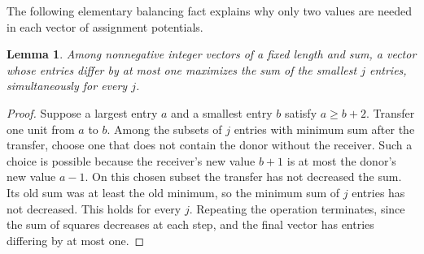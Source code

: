 \documentclass[11pt,reqno]{amsart}
\numberwithin{equation}{section}
\newtheorem{lemma}[theorem]{Lemma}
\theoremstyle{definition}
\theoremstyle{remark}
\begin{document}
The following elementary balancing fact explains why only two values
are needed in each vector of assignment potentials.

\begin{lemma}\label{lem:mp:balancing}
Among nonnegative integer vectors of a fixed length and sum, a vector
whose entries differ by at most one maximizes the sum of the smallest
$j$ entries, simultaneously for every $j$.
\end{lemma}
\begin{proof}
Suppose a largest entry $a$ and a smallest entry $b$ satisfy
$a\ge b+2$. Transfer one unit from $a$ to $b$. Among the subsets of
$j$ entries with minimum sum after the transfer, choose one that does
not contain the donor without the receiver. Such a choice is possible
because the receiver's new value $b+1$ is at most the donor's new value
$a-1$. On this chosen subset the transfer has not decreased the sum.
Its old sum was at least the old minimum, so the minimum sum of $j$
entries has not decreased. This holds for every $j$. Repeating the
operation terminates, since the sum of squares decreases at each step,
and the final vector has entries differing by at most one.
\end{proof}
\end{document}
